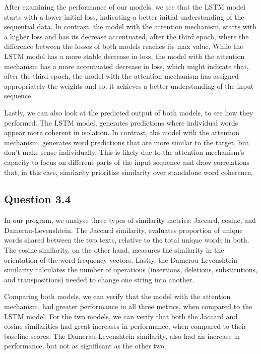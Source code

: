\documentclass{article}
\begin{document}
After examining the performance of our models, we see that the LSTM model starts 
with a  lower initial loss, indicating a better initial understanding of the 
sequential data. In contrast, the model with the attention mechanism, 
starts with a higher loss and has its decrease accentuated, after the third epoch,
where the difference between the losses of both models reaches its max value. 
While the LSTM model has a more stable decrease in loss, the model with the
attention mechanism has a more accentuated decrease in loss, which might indicate
that, after the third epoch, the model with the attention mechanism has assigned 
appropriately the weights and so, it achieves a better understanding of the input
sequence.

Lastly, we can also look at the predicted output of both models, to see how they
performed. The LSTM model, generates predictions where individual words appear
more coherent in isolation. In contrast, the model with the attention mechanism,
generates word predictions that are more similar to the target, but don't make sense
individually. This is likely due to the attention mechanism's capacity to focus on 
different parts of the input sequence and draw correlations that, in this case,
similarity prioritize similarity over standalone word coherence.


\subsection{Question 3.4}
In our program, we analyse three types of similarity metrics: Jaccard, cosine, 
and Damerau-Levenshtein. The Jaccard similarity, evaluates proportion of unique words shared 
between the two texts, relative to the total unique words in both. The cosine similarity, on the other hand, measures  
the similarity in the orientation of the word frequency vectors. Lastly, the Damerau-Levenshtein 
similarity calculates the number of operations (insertions, deletions, substitutions, and transpositions) 
needed to change one string into another.

Comparing both models, we can verify that the model with the attention mechanism, had greater performance
in all three metrics, when compared to the LSTM model. For the two models, we can verify that both the Jaccard 
and cosine similarities had great increases in performance, when compared to their baseline scores. The Damerau-Levenshtein 
similarity, also had an increase in performance, but not as significant as the other two.
\end{document}
